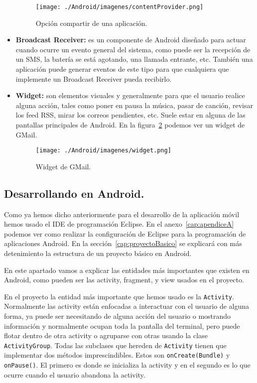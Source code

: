 \begin{itemize}
\begin{figure}[h]
  \centering
    \texttt{[image: ./Android/imagenes/contentProvider.png]}
  \caption{Opción compartir de una aplicación.}
  \label{fig:contentProvider}
\end{figure}

\item \textbf{Broadcast Receiver:} es un componente de Android diseñado para actuar cuando ocurre un evento general del sistema, como puede ser la recepción de un SMS, la batería se está agotando, una llamada entrante, etc. También una aplicación puede generar eventos de este tipo para que cualquiera que implemente un Broadcast Receiver pueda recibirlo.

\item \textbf{Widget:} son elementos visuales y generalmente para que el usuario realice alguna acción, tales como poner en pausa la música, pasar de canción, revisar los feed RSS, mirar los correos pendientes, etc. Suele estar en alguna de las pantallas principales de Android. En la figura~\ref{fig:widget} podemos ver un widget de GMail.
 
\begin{figure}[h]
  \centering
    \texttt{[image: ./Android/imagenes/widget.png]}
  \caption{Widget de GMail.}
  \label{fig:widget}
\end{figure}

\end{itemize}

\subsection{Desarrollando en Android.}\label{cap:desarrolandoAndroid}

Como ya hemos dicho anteriormente para el desarrollo de la aplicación móvil hemos usado el IDE de programación Eclipse. En el anexo~\ref{cap:apendiceA} podemos ver como realizar la configuración de Eclipse para la programación de aplicaciones Android. En la sección~\ref{cap:proyectoBasico} se explicará con más detenimiento la estructura de un proyecto básico en Android.

En este apartado vamos a explicar las entidades más importantes que existen en Android, como pueden ser las activity, fragment, y view usados en el proyecto.

En el proyecto la entidad más importante que hemos usado es la \lstinline{Activity}. Normalmente las activity están enfocadas a interactuar con el usuario de alguna forma, ya puede ser necesitando de alguna acción del usuario o mostrando información y normalmente ocupan toda la pantalla del terminal, pero puede flotar dentro de otra activity o agruparse con otras usando la clase \lstinline{ActivityGroup}. Todas las subclases que hereden de \lstinline{Activity} tienen que implementar dos métodos imprescindibles. Estos son \lstinline{onCreate(Bundle)} y \lstinline{onPause()}. El primero es donde se inicializa la activity y en el segundo es lo que ocurre cuando el usuario abandona la activity.

